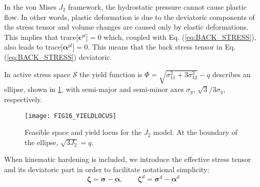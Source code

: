 In the von Mises $J_2$ framework, the hydrostatic pressure cannot cause plastic
flow.
In other words, plastic deformation is due to the deviatoric components of the 
stress tensor and volume changes are caused only by elastic deformations. This
implies that trace[$\bm{\epsilon}^{pl}$]$=0$ which, coupled with Eq.
(\ref{eq:BACK_STRESS}), also leads to trace[$\bm{\alpha}^{pl}$]$=0$. This means 
that
the back stress tensor in Eq. (\ref{eq:BACK_STRESS}) deviatoric.

In active stress space $\mathcal{S}$ the yield function is 
$\Phi = \sqrt{\sigma_{11}^2 + 3\sigma_{12}^2}-q$ describes an ellipse, shown
in \ref{fig:FIG16_YIELDLOCUS}, with
semi-major and semi-minor axes $\sigma_y$, $\sqrt{3}^{}/3\sigma_y$, 
respectively.

\begin{figure}[t]
	\centering
	\texttt{[image: FIG16\_YIELDLOCUS]}
	\caption{Feasible space and yield locus for the $J_2$ model. At the 
	boundary of the ellipse,
		$\sqrt{3J_2}=q$.}
	\label{fig:FIG16_YIELDLOCUS}
\end{figure}

When kinematic
hardening is included, we introduce the effective stress tensor and its
deviatoric part in order to facilitate notational simplicity:
\begin{equation}
	\bm{\zeta} = \bm{\sigma}-\bm{\alpha},\qquad \bm{\zeta}^d =
	\bm{\sigma}^d-\bm{\alpha}^d
	\label{eq:EFFECTIVE_STRESS}
\end{equation}

